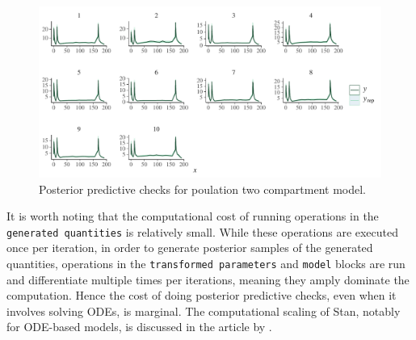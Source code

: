 \begin{figure}
  \begin{center}
  \includegraphics[width=6in]{../figures/twocpt_pop_ppc_4x8.pdf}
  \end{center}
  \caption{Posterior predictive checks for poulation two compartment model.}
  \label{fig:twoCptPop_ppc}
\end{figure}

It is worth noting that the computational cost of running operations in the \texttt{generated quantities} is relatively small.
While these operations are executed once per iteration, in order to generate posterior samples of the generated quantities, operations in the \texttt{transformed parameters} and \texttt{model} blocks are run and differentiate multiple times per iterations, meaning they amply dominate the computation.
Hence the cost of doing posterior predictive checks, even when it involves solving ODEs, is marginal.
The computational scaling of Stan, notably for ODE-based models, is discussed in the article by \citet{Grinsztajn:2021}.
